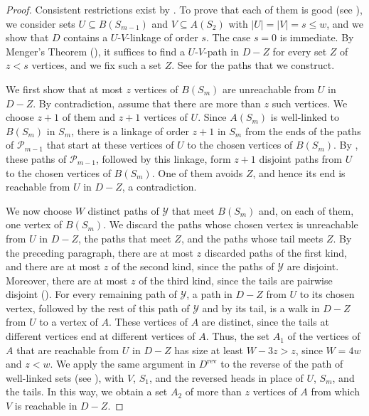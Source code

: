 \documentclass[fontsize=12pt,leading=14pt]{fullpaper}
\newcommand{\rev}{\mathrm{rev}}
\newcommand{\Pcal}{\mathcal{P}}
\newcommand{\Ycal}{\mathcal{Y}}
\begin{document}
\begin{proof}
  Consistent restrictions exist by .
  To prove that each of them is good (see ), we consider sets $U\subseteq B(S_{m-1})$ and $V\subseteq A(S_2)$ with $|U|=|V|=s\le w$, and we show that $D$ contains a $U$-$V$-linkage of order $s$.
  The case $s=0$ is immediate.
  By Menger's Theorem (), it suffices to find a $U$-$V$-path in $D-Z$ for every set $Z$ of $z<s$ vertices, and we fix such a set $Z$.
  See  for the paths that we construct.

  We first show that at most $z$ vertices of $B(S_m)$ are unreachable from $U$ in $D-Z$.
  By contradiction, assume that there are more than $z$ such vertices.
  We choose $z+1$ of them and $z+1$ vertices of $U$.
  Since $A(S_m)$ is well-linked to $B(S_m)$ in $S_m$, there is a linkage of order $z+1$ in $S_m$ from the ends of the paths of $\Pcal_{m-1}$ that start at these vertices of $U$ to the chosen vertices of $B(S_m)$.
  By , these paths of $\Pcal_{m-1}$, followed by this linkage, form $z+1$ disjoint paths from $U$ to the chosen vertices of $B(S_m)$.
  One of them avoids $Z$, and hence its end is reachable from $U$ in $D-Z$, a contradiction.

  We now choose $W$ distinct paths of $\Ycal$ that meet $B(S_m)$ and, on each of them, one vertex of $B(S_m)$.
  We discard the paths whose chosen vertex is unreachable from $U$ in $D-Z$, the paths that meet $Z$, and the paths whose tail meets $Z$.
  By the preceding paragraph, there are at most $z$ discarded paths of the first kind, and there are at most $z$ of the second kind, since the paths of $\Ycal$ are disjoint.
  Moreover, there are at most $z$ of the third kind, since the tails are pairwise disjoint ().
  For every remaining path of $\Ycal$, a path in $D-Z$ from $U$ to its chosen vertex, followed by the rest of this path of $\Ycal$ and by its tail, is a walk in $D-Z$ from $U$ to a vertex of $A$.
  These vertices of $A$ are distinct, since the tails at different vertices end at different vertices of $A$.
  Thus, the set $A_1$ of the vertices of $A$ that are reachable from $U$ in $D-Z$ has size at least $W-3z>z$, since $W=4w$ and $z<w$.
  We apply the same argument in $D^\rev$ to the reverse of the path of well-linked sets (see ), with $V$, $S_1$, and the reversed heads in place of $U$, $S_m$, and the tails.
  In this way, we obtain a set $A_2$ of more than $z$ vertices of $A$ from which $V$ is reachable in $D-Z$.


\end{proof}
\end{document}
